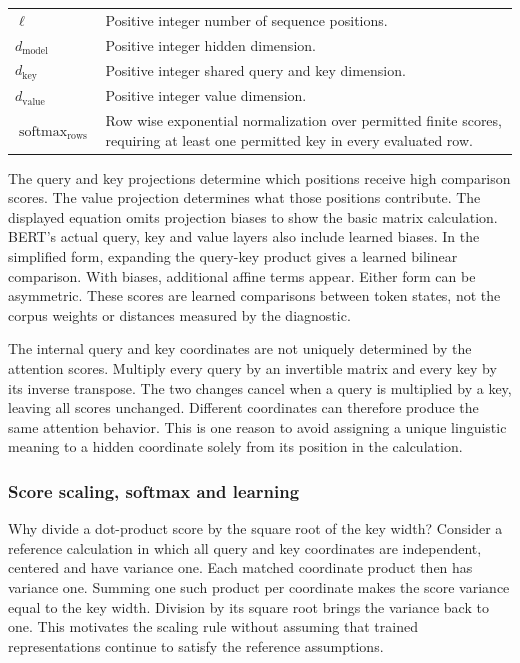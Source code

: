 \documentclass[10pt,letterpaper]{article}
\begin{document}
\begin{minipage}{\linewidth}
{\begin{tabularx}{\linewidth}{@{}p{.14\linewidth}X@{}}
$\ell$ & Positive integer number of sequence positions.\\
$d_{\mathrm{model}}$ & Positive integer hidden dimension.\\
$d_{\mathrm{key}}$ & Positive integer shared query and key dimension.\\
$d_{\mathrm{value}}$ & Positive integer value dimension.\\
$\operatorname{softmax}_{\mathrm{rows}}$ & Row wise exponential normalization over permitted finite scores, requiring at least one permitted key in every evaluated row.\\
\end{tabularx}}
\par\vspace{2pt}
\end{minipage}\par
The query and key projections determine which positions receive high comparison scores. The value projection determines what those positions contribute. The displayed equation omits projection biases to show the basic matrix calculation. BERT's actual query, key and value layers also include learned biases. In the simplified form, expanding the query-key product gives a learned bilinear comparison. With biases, additional affine terms appear. Either form can be asymmetric. These scores are learned comparisons between token states, not the corpus weights or distances measured by the diagnostic.\par

The internal query and key coordinates are not uniquely determined by the attention scores. Multiply every query by an invertible matrix and every key by its inverse transpose. The two changes cancel when a query is multiplied by a key, leaving all scores unchanged. Different coordinates can therefore produce the same attention behavior. This is one reason to avoid assigning a unique linguistic meaning to a hidden coordinate solely from its position in the calculation.\par

\subsubsection{Score scaling, softmax and learning}
Why divide a dot-product score by the square root of the key width? Consider a reference calculation in which all query and key coordinates are independent, centered and have variance one. Each matched coordinate product then has variance one. Summing one such product per coordinate makes the score variance equal to the key width. Division by its square root brings the variance back to one. This motivates the scaling rule without assuming that trained representations continue to satisfy the reference assumptions.\par
\end{document}
